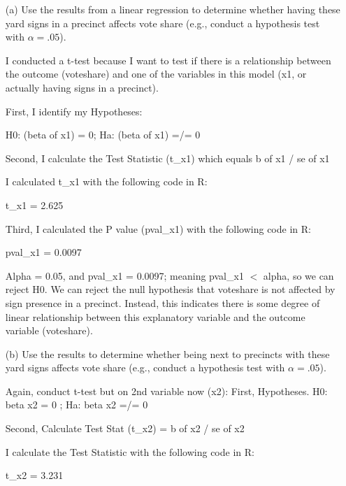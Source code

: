 \documentclass[12pt,letterpaper]{article}
\begin{document}
\vspace{10cm}
\begin{enumerate}
	\item [(a)] Use the results from a linear regression to determine whether having these yard signs in a precinct affects vote share (e.g., conduct a hypothesis test with $\alpha = .05$).
	
	I conducted a t-test because I want to test if there is a relationship between the outcome (voteshare) and one of the variables in this model (x1, or actually having signs in a precinct). 
	
	First, I identify my Hypotheses:

	H0: (beta of x1) = 0;
	Ha: (beta of x1) =/= 0
	
	Second, I calculate the Test Statistic (t\_x1) which equals b of x1 / se of x1
	
	I calculated t\_x1 with the following code in R:
	
	
	
	t\_x1 = 2.625
	
	Third, I calculated the P value (pval\_x1) with the following code in R:
	
	
	
	pval\_x1 = 0.0097
	
	 Alpha = 0.05, and pval\_x1 = 0.0097; meaning pval\_x1 $<$ alpha, so we can reject H0. We can reject the null hypothesis that voteshare is not affected by sign presence in a precinct. Instead, this indicates there is some degree of linear relationship between this explanatory variable and the outcome variable (voteshare).
	
	\newpage		
	\item [(b)]  Use the results to determine whether being
	next to precincts with these yard signs affects vote
	share (e.g., conduct a hypothesis test with $\alpha = .05$).
	
	Again, conduct t-test but on 2nd variable now (x2):
	First, Hypotheses. H0: beta x2 = 0 ; Ha: beta x2 =/= 0
	
	Second, Calculate Test Stat (t\_x2) = b of x2 / se of x2 
	
	I calculate the Test Statistic with the following code in R:
	
	
	
	t\_x2 = 3.231
	

\end{enumerate}
\end{document}
